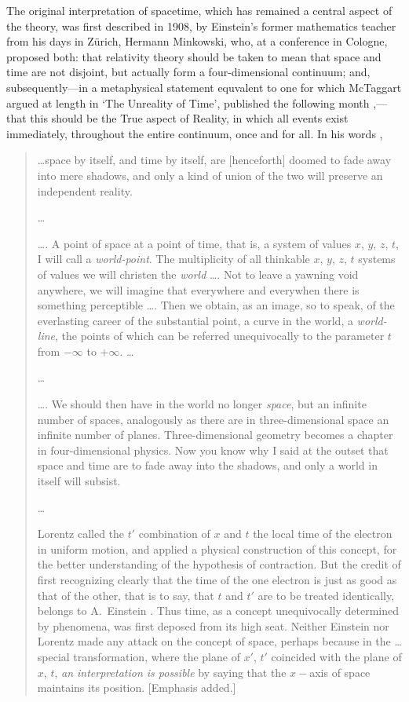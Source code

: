The original interpretation of spacetime, which has remained a central aspect of the theory, was first described in 1908, by Einstein's former mathematics teacher from his days in Z\"{u}rich, Hermann Minkowski, who, at a conference in Cologne, proposed both: that relativity theory should be taken to mean that space and time are not disjoint, but actually form a four-dimensional continuum; and, subsequently---in a metaphysical statement equvalent to one for which McTaggart argued at length in `The Unreality of Time', published the following month \cite{McTaggart1908},---that this should be the True aspect of Reality, in which all events exist immediately, throughout the entire continuum, once and for all. In his words \cite{Einstein1952},
\begin{quotation}
\ldots space by itself, and time by itself, are [henceforth] doomed to fade away into mere shadows, and only a kind of union of the two will preserve an independent reality.

\ldots

\ldots. A point of space at a point of time, that is, a system of values $x$, $y$, $z$, $t$, I will call a \textit{world-point}. The multiplicity of all thinkable $x$, $y$, $z$, $t$ systems of values we will christen the \textit{world} \ldots. Not to leave a yawning void anywhere, we will imagine that everywhere and everywhen there is something perceptible \ldots. Then we obtain, as an image, so to speak, of the everlasting career of the substantial point, a curve in the world, a \textit{world-line}, the points of which can be referred unequivocally to the parameter $t$ from $-\infty$ to $+\infty$. \ldots

\ldots

\ldots. We should then have in the world no longer \textit{space}, but an infinite number of spaces, analogously as there are in three-dimensional space an infinite number of planes. Three-dimensional geometry becomes a chapter in four-dimensional physics. Now you know why I said at the outset that space and time are to fade away into the shadows, and only a world in itself will subsist. 

\ldots

Lorentz called the $t'$ combination of $x$ and $t$ the local time of the electron in uniform motion, and applied a physical construction of this concept, for the better understanding of the hypothesis of contraction. But the credit of first recognizing clearly that the time of the one electron is just as good as that of the other, that is to say, that $t$ and $t'$ are to be treated identically, belongs to A.~Einstein \cite{Einstein1905a}. Thus time, as a concept unequivocally determined by phenomena, was first deposed from its high seat. Neither Einstein nor Lorentz made any attack on the concept of space, perhaps because in the \ldots special transformation, where the plane of $x'$, $t'$ coincided with the plane of $x$, $t$, \textit{an interpretation is possible} by saying that the $x-$axis of space maintains its position. [Emphasis added.]
\end{quotation} 
